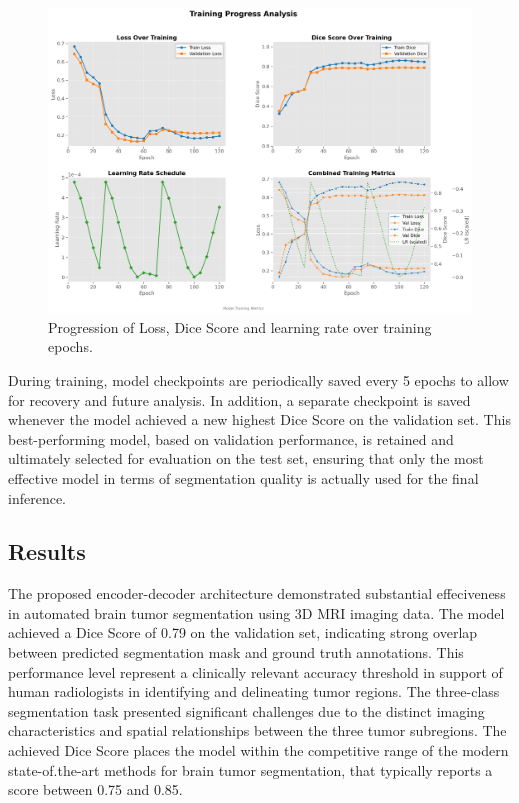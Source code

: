 \documentclass[10pt,twocolumn,letterpaper]{article}
\begin{document}
\begin{figure}[H]
    \centering
    \includegraphics[width=\linewidth]{img/training4mb.png}
    \caption{Progression of Loss, Dice Score and learning rate over training epochs.}
\end{figure}

During training, model checkpoints are periodically saved every 5 epochs to allow for recovery and future analysis. In addition, a separate checkpoint is saved whenever the model achieved a new highest Dice Score on the validation set. This best-performing model, based on validation performance, is retained and ultimately selected for evaluation on the test set, ensuring that only the most effective model in terms of segmentation quality is actually used for the final inference.


\subsection{Results}
The proposed encoder-decoder architecture demonstrated substantial effeciveness in automated brain tumor segmentation using 3D MRI imaging data. The model achieved a Dice Score of 0.79 on the validation set, indicating strong overlap between predicted segmentation mask and ground truth annotations. This performance level represent a clinically relevant accuracy threshold in support of human radiologists in identifying and delineating tumor regions.
The three-class segmentation task presented significant challenges due to the distinct imaging characteristics and spatial relationships between the three tumor subregions.
The achieved Dice Score places the model within the competitive range of the modern state-of.the-art methods for brain tumor segmentation, that typically reports a score between 0.75 and 0.85.
\end{document}
